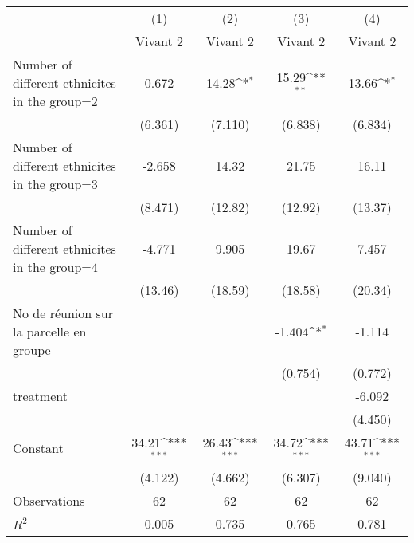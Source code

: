 {
\def\sym#1{\ifmmode^{#1}\else\(^{#1}\)\fi}
\begin{tabular}{l*{4}{c}}
\hline\hline
                    &\multicolumn{1}{c}{(1)}&\multicolumn{1}{c}{(2)}&\multicolumn{1}{c}{(3)}&\multicolumn{1}{c}{(4)}\\
                    &\multicolumn{1}{c}{Vivant 2}&\multicolumn{1}{c}{Vivant 2}&\multicolumn{1}{c}{Vivant 2}&\multicolumn{1}{c}{Vivant 2}\\
\hline
Number of different ethnicites in the group=2&       0.672         &       14.28\sym{*}  &       15.29\sym{**} &       13.66\sym{*}  \\
                    &     (6.361)         &     (7.110)         &     (6.838)         &     (6.834)         \\
[1em]
Number of different ethnicites in the group=3&      -2.658         &       14.32         &       21.75         &       16.11         \\
                    &     (8.471)         &     (12.82)         &     (12.92)         &     (13.37)         \\
[1em]
Number of different ethnicites in the group=4&      -4.771         &       9.905         &       19.67         &       7.457         \\
                    &     (13.46)         &     (18.59)         &     (18.58)         &     (20.34)         \\
[1em]
No de réunion sur la parcelle en groupe&                     &                     &      -1.404\sym{*}  &      -1.114         \\
                    &                     &                     &     (0.754)         &     (0.772)         \\
[1em]
treatment           &                     &                     &                     &      -6.092         \\
                    &                     &                     &                     &     (4.450)         \\
[1em]
Constant            &       34.21\sym{***}&       26.43\sym{***}&       34.72\sym{***}&       43.71\sym{***}\\
                    &     (4.122)         &     (4.662)         &     (6.307)         &     (9.040)         \\
\hline
Observations        &          62         &          62         &          62         &          62         \\
\(R^{2}\)           &       0.005         &       0.735         &       0.765         &       0.781         \\

\end{tabular}}

